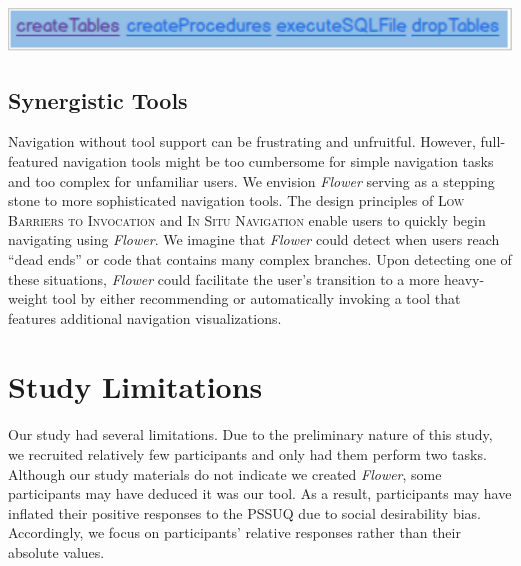 \documentclass[conference]{IEEEtran}
\begin{document}
\noindent\includegraphics[width=\columnwidth]{images/HyperlinkColoring}



\subsection{Synergistic Tools}
Navigation without tool support can be frustrating and unfruitful.
However, full-featured navigation tools might be too cumbersome for simple navigation tasks and too complex for unfamiliar users.
We envision \textit{Flower} serving as a stepping stone to more sophisticated navigation tools. 
The design principles of \textsc{Low Barriers to Invocation} and \textsc{In Situ Navigation} enable users to quickly begin navigating using \textit{Flower}. 
We imagine that \textit{Flower} could detect when users reach ``dead ends'' or code that contains many complex branches.
Upon detecting one of these situations, \textit{Flower} could facilitate the user's transition to a more heavy-weight tool by either recommending or automatically invoking a tool that features additional navigation visualizations.

	




\section{Study Limitations}
Our study had several limitations.
Due to the preliminary nature of this study, we recruited relatively few participants and only had them perform two tasks.
Although our study materials do not indicate we created \textit{Flower}, some participants may have deduced it was our tool.
As a result, participants may have inflated their positive responses to the PSSUQ due to social desirability bias.
Accordingly, we focus on participants' relative responses rather than their absolute values.
\end{document}
